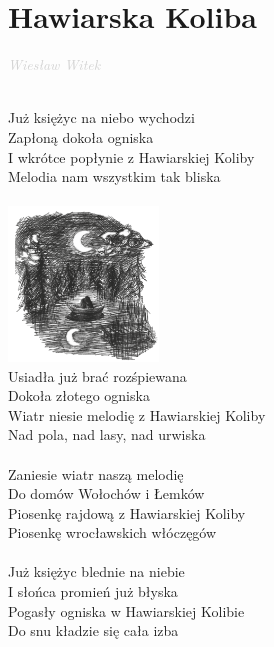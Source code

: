 \documentclass[a5paper, 10pt]{book}
\begin{document}
\section{Hawiarska Koliba}\textcolor{lightgray}{\textit{Wiesław Witek}}\\~\\
\begin{minipage}[t]{0.8\textwidth}
Już księżyc na niebo wychodzi\\
Zapłoną dokoła ogniska\\
I wkrótce popłynie z Hawiarskiej Koliby\\
Melodia nam wszystkim tak bliska\\
\\
\includegraphics[width = 40mm, right]{images/hawiarska_koliba.png}\vspace*{-41.5mm}\\
Usiadła już brać rozśpiewana\\
Dokoła złotego ogniska\\
Wiatr niesie melodię z Hawiarskiej Koliby\\
Nad pola, nad lasy, nad urwiska\\
\\
Zaniesie wiatr naszą melodię\\
Do domów Wołochów i Łemków\\
Piosenkę rajdową z Hawiarskiej Koliby\\
Piosenkę wrocławskich włóczęgów\\
\\
Już księżyc blednie na niebie\\
I słońca promień już błyska\\
Pogasły ogniska w Hawiarskiej Kolibie\\
Do snu kładzie się cała izba\\
\end{minipage}
\end{document}
